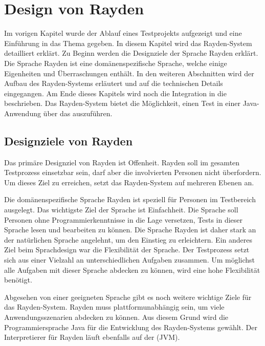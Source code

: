 \chapter{Design von Rayden}
\label{cha:Design}

Im vorigen Kapitel wurde der Ablauf eines Testprojekts aufgezeigt und eine Einführung in das Thema  gegeben. In diesem Kapitel wird das Rayden-System detailliert erklärt. Zu Beginn werden die Designziele der Sprache Rayden erklärt. Die Sprache Rayden ist eine domänenspezifische Sprache, welche einige Eigenheiten und Überraschungen enthält. In den weiteren Abschnitten wird der Aufbau des Rayden-Systems erläutert und auf die technischen Details eingegangen. Am Ende dieses Kapitels wird noch die Integration in die  \cite{JavaScriptApi} beschrieben. Das Rayden-System bietet die Möglichkeit, einen Test in einer Java-Anwendung über das  auszuführen.


\section{Designziele von Rayden}

Das primäre Designziel von Rayden ist Offenheit. Rayden soll im gesamten Testprozess einsetzbar sein, darf aber die involvierten Personen nicht überfordern. Um dieses Ziel zu erreichen, setzt das Rayden-System auf mehreren Ebenen an.

\SuperPar
Die domänenspezifische Sprache Rayden ist speziell für Personen im Testbereich ausgelegt. Das wichtigste Ziel der Sprache ist Einfachheit. Die Sprache soll Personen ohne Programmierkenntnisse in die Lage versetzen, Tests in dieser Sprache lesen und bearbeiten zu können. Die Sprache Rayden ist daher stark an der natürlichen Sprache angelehnt, um den Einstieg zu erleichtern. Ein anderes Ziel beim Sprachdesign war die Flexibilität der Sprache. Der Testprozess setzt sich aus einer Vielzahl an unterschiedlichen Aufgaben zusammen. Um möglichst alle Aufgaben mit dieser Sprache abdecken zu können, wird eine hohe Flexibilität benötigt. 

\SuperPar
Abgesehen von einer geeigneten Sprache gibt es noch weitere wichtige Ziele für das Rayden-System. Rayden muss plattformunabhängig sein, um viele Anwendungsszenarien abdecken zu können. Aus diesem Grund wird die Programmiersprache Java für die Entwicklung des Rayden-Systems gewählt. Der Interpretierer für Rayden läuft ebenfalls auf der  (JVM).

